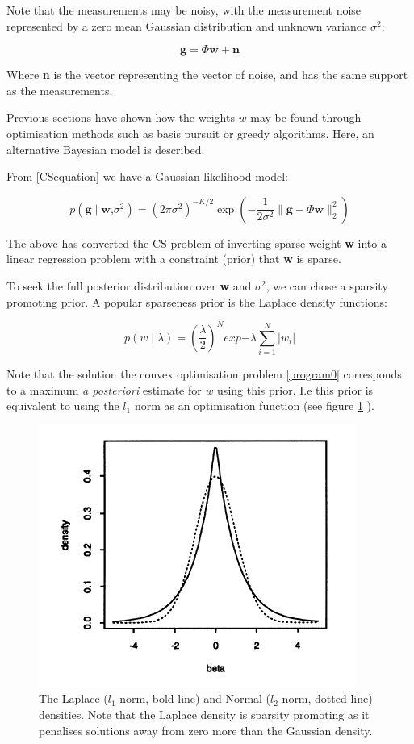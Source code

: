 \documentclass[12pt, a4paper]{article}
\begin{document}
Note that the measurements may be noisy, with the measurement noise represented by a zero mean Gaussian distribution and unknown variance \( \sigma^2 \):

\begin{equation}
\textbf{g} = \Phi \textbf{w} + \textbf{n}
\end{equation}
\label{CSequation}

Where \textbf{n} is the vector representing the vector of noise, and has the same support as the measurements. 

Previous sections have shown how the weights \(w\) may be found through optimisation methods such as basis pursuit or greedy algorithms. Here, an alternative Bayesian model is described.

From \ref{CSequation} we have a Gaussian likelihood model: 

\begin{equation}
p \left( \textbf{g} \mid \textbf{w}\text{,} \sigma^2 \right) = (2 \pi \sigma^2)^{-K/2} \exp{\left(- \frac{1}{2 \sigma^2} \|\textbf{g} - \Phi	\textbf{w}\|_{2}^{2} \right)} 
\end{equation}

The above has converted the CS problem of inverting sparse weight \textbf{w} into a linear regression problem with a constraint (prior) that \textbf{w} is sparse. 

To seek the full posterior distribution over \textbf{w} and \( \sigma^2 \), we can chose a sparsity promoting prior. A popular sparseness prior is the Laplace density functions:

\begin{equation}
p\left(w\mid\lambda\right) = \left(\frac{\lambda}{2}\right)^N exp{-\lambda \sum_{i=1}^{N} |w_i|}
\end{equation}

Note that the solution the convex optimisation problem \ref{program0} corresponds to a maximum \textit{a posteriori} estimate for \(w\) using this prior. I.e this prior is equivalent to using the \(l_1\) norm as an optimisation function (see figure \ref{laplacenormal} \cite{Tibshirani1996}).

\begin{figure}[h]
\centering
\includegraphics[height = 7 cm]{LaplaceandNormalDensity.png}
\caption{The Laplace (\(l_1\)-norm, bold line) and Normal (\(l_2\)-norm, dotted line) densities. Note that the Laplace density is sparsity promoting as it penalises solutions away from zero more than the Gaussian density. \cite{Tibshirani1996}}
\label{laplacenormal}
\end{figure}
\end{document}
